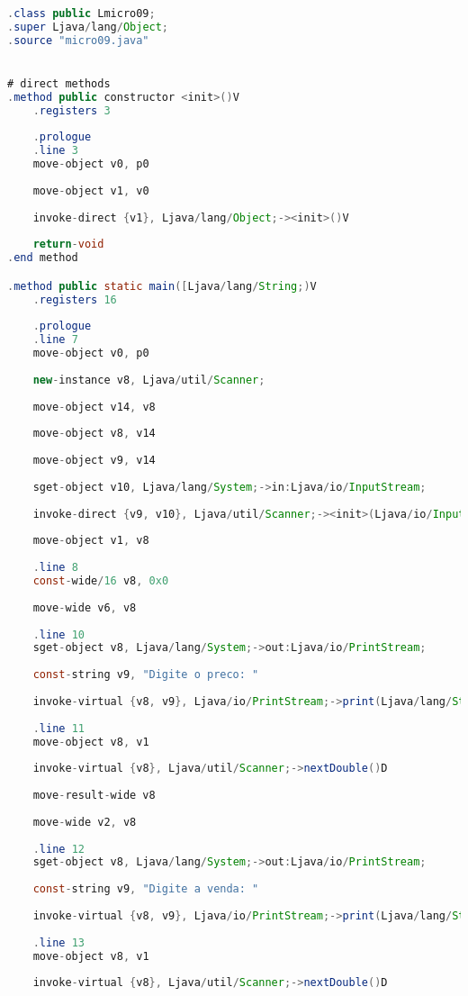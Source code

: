 \documentclass[hidelinks,12pt]{article}
\begin{document}
	\begin{lstlisting}[caption=Smali resultante do .java,language=java]
.class public Lmicro09;
.super Ljava/lang/Object;
.source "micro09.java"


# direct methods
.method public constructor <init>()V
	.registers 3
	
	.prologue
	.line 3
	move-object v0, p0
	
	move-object v1, v0
	
	invoke-direct {v1}, Ljava/lang/Object;-><init>()V
	
	return-void
.end method

.method public static main([Ljava/lang/String;)V
	.registers 16
	
	.prologue
	.line 7
	move-object v0, p0
	
	new-instance v8, Ljava/util/Scanner;
	
	move-object v14, v8
	
	move-object v8, v14
	
	move-object v9, v14
	
	sget-object v10, Ljava/lang/System;->in:Ljava/io/InputStream;
	
	invoke-direct {v9, v10}, Ljava/util/Scanner;-><init>(Ljava/io/InputStream;)V
	
	move-object v1, v8
	
	.line 8
	const-wide/16 v8, 0x0
	
	move-wide v6, v8
	
	.line 10
	sget-object v8, Ljava/lang/System;->out:Ljava/io/PrintStream;
	
	const-string v9, "Digite o preco: "
	
	invoke-virtual {v8, v9}, Ljava/io/PrintStream;->print(Ljava/lang/String;)V
	
	.line 11
	move-object v8, v1
	
	invoke-virtual {v8}, Ljava/util/Scanner;->nextDouble()D
	
	move-result-wide v8
	
	move-wide v2, v8
	
	.line 12
	sget-object v8, Ljava/lang/System;->out:Ljava/io/PrintStream;
	
	const-string v9, "Digite a venda: "
	
	invoke-virtual {v8, v9}, Ljava/io/PrintStream;->print(Ljava/lang/String;)V
	
	.line 13
	move-object v8, v1
	
	invoke-virtual {v8}, Ljava/util/Scanner;->nextDouble()D
	

\end{lstlisting}
\end{document}
